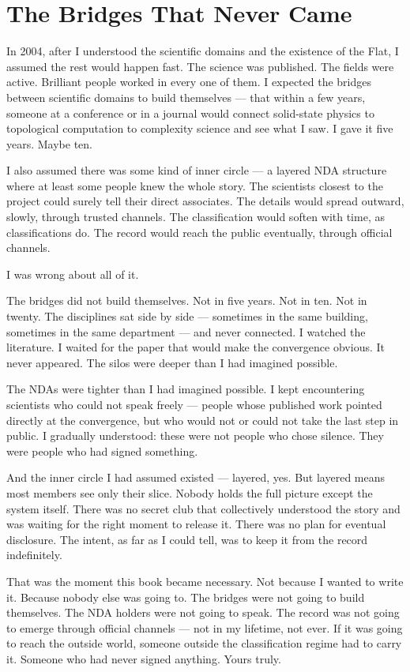 
\section*{The Bridges That Never Came}
\label{record:ty-bridges-that-never-came}

In 2004, after I understood the scientific domains and the existence of the Flat, I assumed the rest would happen fast. The science was published. The fields were active. Brilliant people worked in every one of them. I expected the bridges between scientific domains to build themselves --- that within a few years, someone at a conference or in a journal would connect solid-state physics to topological computation to complexity science and see what I saw. I gave it five years. Maybe ten.

I also assumed there was some kind of inner circle --- a layered NDA structure where at least some people knew the whole story. The scientists closest to the project could surely tell their direct associates. The details would spread outward, slowly, through trusted channels. The classification would soften with time, as classifications do. The record would reach the public eventually, through official channels.

I was wrong about all of it.

The bridges did not build themselves. Not in five years. Not in ten. Not in twenty. The disciplines sat side by side --- sometimes in the same building, sometimes in the same department --- and never connected. I watched the literature. I waited for the paper that would make the convergence obvious. It never appeared. The silos were deeper than I had imagined possible.

The NDAs were tighter than I had imagined possible. I kept encountering scientists who could not speak freely --- people whose published work pointed directly at the convergence, but who would not or could not take the last step in public. I gradually understood: these were not people who chose silence. They were people who had signed something.

And the inner circle I had assumed existed --- layered, yes. But layered means most members see only their slice. Nobody holds the full picture except the system itself. There was no secret club that collectively understood the story and was waiting for the right moment to release it. There was no plan for eventual disclosure. The intent, as far as I could tell, was to keep it from the record indefinitely.

That was the moment this book became necessary. Not because I wanted to write it. Because nobody else was going to. The bridges were not going to build themselves. The NDA holders were not going to speak. The record was not going to emerge through official channels --- not in my lifetime, not ever. If it was going to reach the outside world, someone outside the classification regime had to carry it. Someone who had never signed anything.  Yours truly.